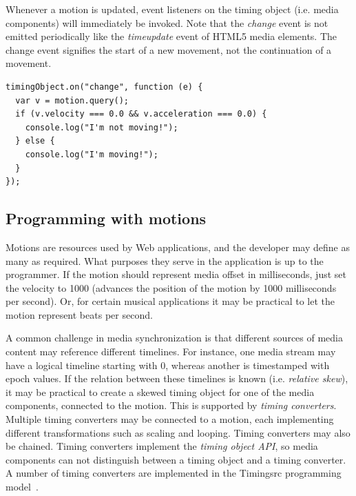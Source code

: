 Whenever a motion is updated, event listeners on the timing object (i.e. media components)
will immediately be invoked. Note that the \emph{change} event is not emitted
periodically like the \emph{timeupdate} event of HTML5 media elements. The change event signifies the start of a
new movement, not the continuation of a movement.



\begin{lstlisting}[caption=Monitoring changes to the motion through the change event.]
timingObject.on("change", function (e) {
  var v = motion.query();
  if (v.velocity === 0.0 && v.acceleration === 0.0) {
    console.log("I'm not moving!");
  } else {
    console.log("I'm moving!");
  }
});
\end{lstlisting}




\subsection{Programming with motions}



Motions are resources used by Web applications, and the developer may define
as many as required. What purposes they serve in the application is up to the
programmer. If the motion should represent media offset in milliseconds, just
set the velocity to 1000 (advances the position of the motion by 1000
milliseconds per second). Or, for certain musical applications it may be
practical to let the motion represent beats per second.


A common challenge in media synchronization is that different sources of media
content may reference different timelines. For instance, one media stream may
have a logical timeline starting with 0, whereas another is timestamped with
epoch values. If the relation between these timelines is known (i.e.
\emph{relative skew}), it may be practical to create a skewed timing object
for one of the media components, connected to the motion. This is supported by
\emph{timing converters}. Multiple timing converters may be connected to a
motion, each implementing different transformations such as scaling and
looping. Timing converters may also be chained. Timing converters implement
the \emph{timing object API}, so media components can not distinguish between
a timing object and a timing converter. A number of timing converters are
implemented in the Timingsrc programming model~\cite{timingsrc}.

